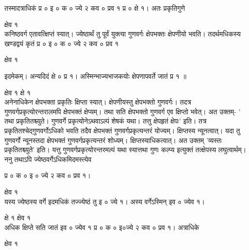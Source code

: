 \documentclass[11pt, openany]{book}
\begin{document}
\begin{sloppypar}
\hangindent=0.2in तस्मादत्राधिकं प्र ० इ ० क ० ज्ये २ कव ० प्रव १ प्र ० क्षे १। अतः प्रकृतिगुणे

\hspace{3.6in}क्षेव १\\

\hangindent=0.2in कनिष्ठवर्ग एतावत्क्षिप्तं स्यात्। ज्येष्ठार्थं तु पूर्वं युक्त्या गुणवर्गः क्षेपभक्तः क्षेपणीयो भवति। तदर्थमधिकस्य खण्डद्वयं कृतं प्र ० इ ० क ० ज्ये २ कव ० प्रव १

\hspace{3.4in}क्षेव १

\hangindent=0.2in इदमेकम्। अन्यदिदं क्षे ० प्र १। अस्मिन्भाज्यभाजकयोः क्षेपणापवर्ते जातं प्र १ ॥

\hspace{1.25in}क्षेव १ \hspace{2.8in}क्षे १\\

\hangindent=0.2in अनेनाधिकेन क्षेपभक्ता प्रकृतिः क्षिप्ता स्यात्। क्षेपणीयस्तु क्षेपभक्तो गुणवर्गः। तदत्र गुणवर्गप्रकृत्योरन्तरालमपि क्षेपभक्तं क्षेप्यम्। तथा सति क्षेपभक्तो गुणवर्ग एव क्षिप्तो भवेत्। अत उक्तम्- ' तथा प्रकृतितश्च्युते। गुणवर्गे प्रकृत्योनेऽथवाऽल्पं शेषकं यथा। तत्तु क्षेपहृतं क्षेपः' इति। तत्र प्रकृतितश्चेद्गुणवर्गोऽधिको भवति तदैव क्षेपभक्तं गुणवर्गप्रकृत्यन्तरं योज्यम्। क्षिप्तस्य न्यूनत्वात्। यदा तु गुणवर्गो न्यूनस्तदा क्षेपभक्तं गुणवर्गप्रकृत्यन्तरं शोध्यम्। क्षिप्तस्याधिकत्वात्। अत उक्तम् 'व्यस्तः प्रकृतितश्च्युते' इति। यत्तु गुणवर्गप्रकृत्योरन्तरमल्पं यथा स्यात्तथा गुणः कल्प्य इत्युक्तं तत्क्षेपस्य लघुत्वार्थम्। ननु तथाऽपि ज्येष्ठवर्गेऽधिकमिदमस्त्येव 

\hspace{1.5in}प्र ० क ० इ ० ज्ये २ कव ० प्रव १।

\hspace{3.3in}क्षेव १\\

\hangindent=0.2in यस्य ज्येष्ठस्य वर्गे इदमधिकं तज्ज्येष्ठं तु इ ० ज्ये १। अस्य वर्गेऽस्मिन् इव ० ज्येव १।

\hspace{2.5in}क्षे १\hspace{1.9in} क्षेव १\\

\hangindent=0.2in अधिक क्षिप्ते सति जातं इव ० ज्येव १ प्र ० क ० इ०ज्ये २ कव ० प्रव १। अत्राधिके

\hspace{4.1in}क्षेव १\\


\end{sloppypar}
\end{document}
